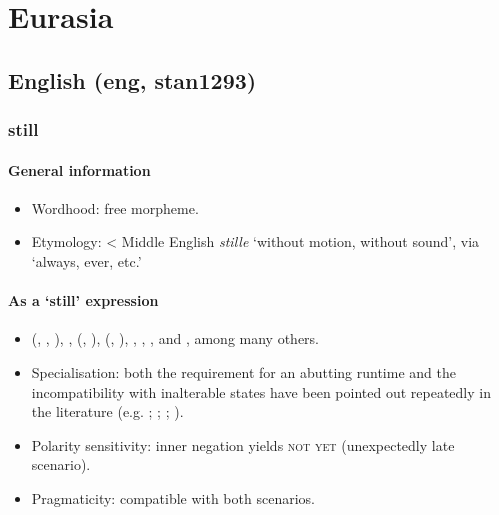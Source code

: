 \chapter{Eurasia}
\label{appendixEurasia}
\section{English (eng, stan1293)} 
	\label{appendixEnglish}
	

\subsection{still}

\subsubsection{General information}
\begin{itemize}
	\item Wordhood: free morpheme.
	\item Etymology: < Middle English \textit{stille} \lq without motion, without sound', via \lq always, ever, etc.\rq{}
\end{itemize}


\subsubsection{As a \lq{}still\rq{ }expression}
\begin{itemize}
	\item {} (\citeyear{vanderAuwera1991BeyondDuality}, \citeyear{vanderAuwera1993}, \citeyear{vanderAuwera1998}), \textcite{vanBaar1997}, \citeauthor{Ippolito2004} (\citeyear{Ippolito2004}, \citeyear{Ippolito2007}), \citeauthor{Koenig1977} (\citeyear{Koenig1977}, \citeyear[ch. 7]{Koenig1991}), \textcite{KoenigTraugott1982}, \textcite{Krifka2000}, \textcite{Lewis2019}, \textcite{Michaelis1993} and \textcite{Mittwoch1993}, among many others.
	\item Specialisation: both the requirement for an abutting runtime and the incompatibility with inalterable states have been pointed out repeatedly in the literature (e.g. \cite{Beck2020}; \cite{Ippolito2007}; \cite{Koenig1991}; \cite{Michaelis1993}).
	\item Polarity sensitivity: inner negation yields \textsc{not yet} (unexpectedly late scenario).
	\item Pragmaticity: compatible with both scenarios.
\end{itemize}

